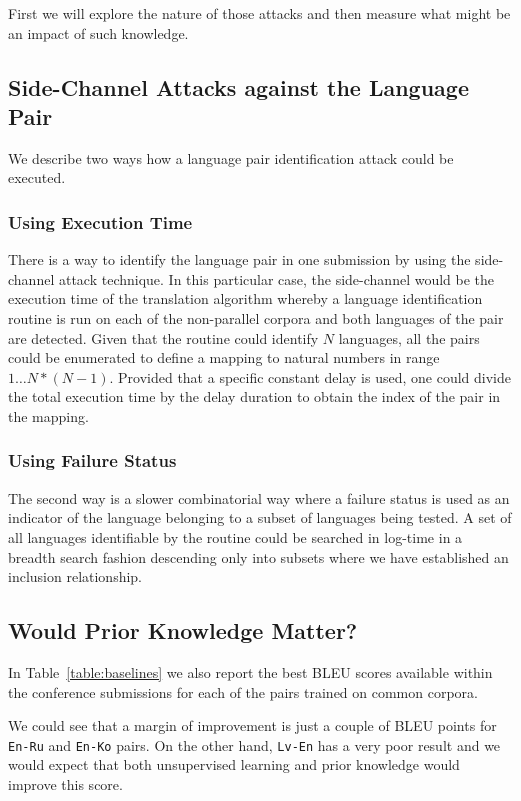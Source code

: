 \documentclass[]{article}
\begin{document}
First we will explore the nature of those attacks and then measure what might be an impact of such knowledge.

\subsection{Side-Channel Attacks against the Language Pair}
\label{sect:attack}

We describe two ways how a language pair identification attack could be executed.

\subsubsection{Using Execution Time}

There is a way to identify the language pair in one submission by using the side-channel attack technique.
In this particular case, the side-channel would be the execution time of the translation algorithm whereby a language identification routine is run on each of the non-parallel corpora and both languages of the pair are detected.
Given that the routine could identify $N$ languages, all the pairs could be enumerated to define a mapping to natural numbers in range $1\dots N*(N-1)$.
Provided that a specific constant delay is used, one could divide the total execution time by the delay duration to obtain the index of the pair in the mapping.

\subsubsection{Using Failure Status}

The second way is a slower combinatorial way where a failure status is used as an indicator of the language belonging to a subset of languages being tested.
A set of all languages identifiable by the routine could be searched in log-time in a breadth search fashion descending only into subsets where we have established an inclusion relationship.

\subsection{Would Prior Knowledge Matter?}
\label{sect:prior}

In Table~\ref{table:baselines} we also report the best BLEU scores available within the conference submissions for each of the pairs trained on common corpora.

We could see that a margin of improvement is just a couple of BLEU points for {\tt En-Ru} and {\tt En-Ko} pairs.
On the other hand, {\tt Lv-En} has a very poor result and we would expect that both unsupervised learning and prior knowledge would improve this score.
\end{document}
